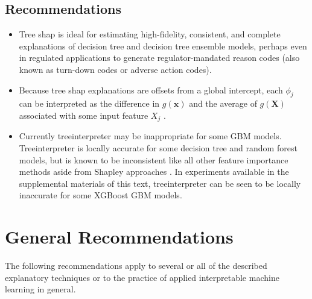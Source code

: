\documentclass[11pt]{asaproc}
\begin{document}
\subsection{Recommendations}

\begin{itemize}
	
	\item Tree shap is ideal for estimating high-fidelity, consistent, and complete explanations of decision tree and decision tree ensemble models, perhaps even in regulated applications to generate regulator-mandated reason codes (also known as turn-down codes or adverse action codes).
	
	\item Because tree shap explanations are offsets from a global intercept, each $\phi_j$ can be interpreted as the difference in $g(\mathbf{x})$ and the average of $g(\mathbf{X})$ associated with some input feature $X_j$ \cite{molnar}. 
		
	\item Currently treeinterpreter may be inappropriate for some GBM models. Treeinterpreter is locally accurate for some decision tree and random forest models, but is known to be inconsistent like all other feature importance methods aside from Shapley approaches \cite{tree_shap}. In experiments available in the supplemental materials of this text, treeinterpreter can be seen to be locally inaccurate for some XGBoost GBM models. 
	
\end{itemize}

\section{General Recommendations} \label{sec:gen_rec}

The following recommendations apply to several or all of the described explanatory techniques or to the practice of applied interpretable machine learning in general.
\end{document}
